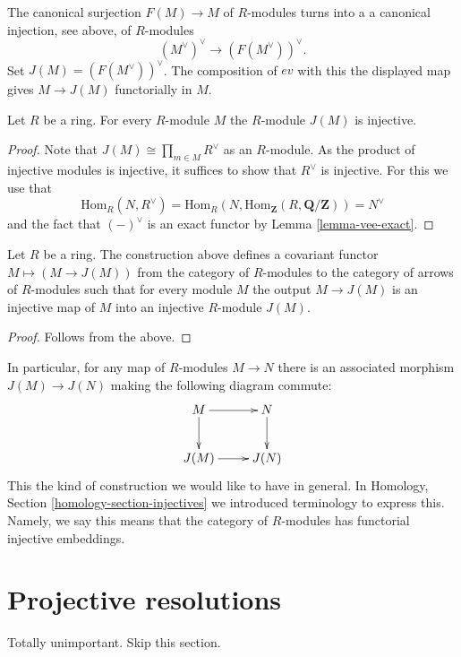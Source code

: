 \noindent
The canonical surjection $F(M) \to M$ of $R$-modules turns into a
a canonical injection, see above, of $R$-modules 
$$
(M^\vee)^\vee \longrightarrow (F(M^\vee))^\vee.
$$
Set $J(M) = (F(M^\vee))^\vee$. The composition of $ev$ with this
the displayed map gives $M \to J(M)$ functorially in $M$.

\begin{lemma}
\label{lemma-JM-injective}
Let $R$ be a ring. For every $R$-module $M$ the
$R$-module $J(M)$ is injective.
\end{lemma}

\begin{proof}
Note that $J(M) \cong \prod_{m\in M} R^\vee$ as an $R$-module.
As the product of injective modules is injective, it suffices to
show that $R^\vee$ is injective. For this we use that 
$$
\text{Hom}_R(N, R^\vee) =
\text{Hom}_R(N, \text{Hom}_{\mathbf{Z}}(R, \mathbf{Q}/\mathbf{Z})) =
N^\vee
$$
and the
fact that $(-)^\vee$ is an exact functor by Lemma
\ref{lemma-vee-exact}.
\end{proof}

\begin{lemma}
\label{lemma-injectives-modules}
Let $R$ be a ring.
The construction above defines a covariant functor
$M \mapsto (M \to J(M))$ from the category of
$R$-modules to the category of arrows of $R$-modules
such that for every module $M$ the output
$M \to J(M)$ is an injective map of $M$ into
an injective $R$-module $J(M)$.
\end{lemma}

\begin{proof}
Follows from the above.
\end{proof}

\noindent
In particular, for any map of $R$-modules $M \to N$ 
there is an associated morphism $J(M) \to J(N)$
making the following diagram commute:
$$
\xymatrix{
M \ar[d] \ar[r] & N \ar[d] \\
J(M) \ar[r] & J(N) }
$$
This the kind of construction we would like to have in general.
In Homology, Section \ref{homology-section-injectives}
we introduced terminology to express this. Namely,
we say this means that the category of $R$-modules
has functorial injective embeddings.

\section{Projective resolutions}
\label{section-projective-resolution}

\noindent
Totally unimportant. Skip this section.


